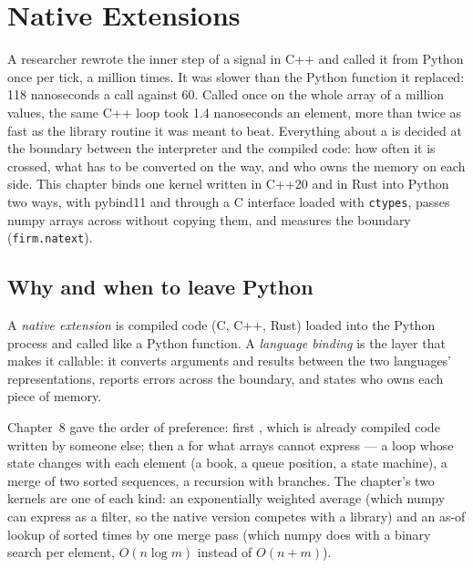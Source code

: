 \chapter{Native Extensions}\label{ch:pl:native-extensions}

A researcher rewrote the inner step of a signal in C++ and called it from Python once per tick, a million times. It was slower
than the Python function it replaced: 118 nanoseconds a call against 60. Called once on the whole array of a million values, the
same C++ loop took 1.4 nanoseconds an element, more than twice as fast as the library routine it was meant to beat. Everything
about a  is decided at the boundary between the interpreter and the compiled code: how often it is crossed, what
has to be converted on the way, and who owns the memory on each side. This chapter binds one kernel written in C++20 and in Rust into
Python two ways, with pybind11 and through a C interface loaded with \texttt{ctypes}, passes numpy arrays across without copying them,
and measures the boundary (\texttt{firm.natext}).

\section{Why and when to leave Python}

\begin{definition}\label{def:pl:native-extensions:extension}
A \emph{native extension} is compiled code (C, C++, Rust) loaded into the Python process and called like a
Python function. A \emph{language binding} is the layer that makes it callable: it converts arguments and
results between the two languages' representations, reports errors across the boundary, and states who owns each piece of memory.
\end{definition}

Chapter~8 gave the order of preference: first , which is already compiled code written by someone else; then a
 for what arrays cannot express --- a loop whose state changes with each element (a book, a queue position, a state
machine), a merge of two sorted sequences, a recursion with branches. The chapter's two kernels are one of each kind: an exponentially
weighted average (which numpy can express as a filter, so the native version competes with a library) and an as-of lookup of sorted
times by one merge pass (which numpy does with a binary search per element, $O(n \log m)$ instead of $O(n + m)$).

